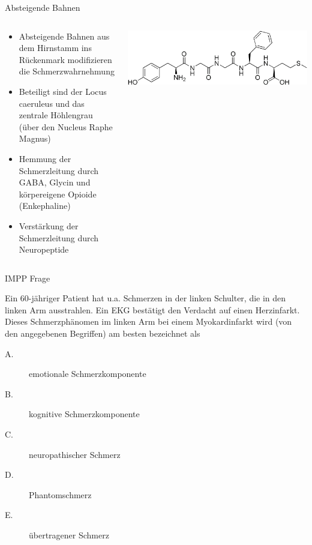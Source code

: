 \documentclass{beamer}
\begin{document}
\begin{frame}{Absteigende Bahnen}


\begin{columns}[c]

\begin{column}{7cm}
\begin{itemize}
    \item 
    Absteigende Bahnen aus dem Hirnstamm ins Rückenmark modifizieren die Schmerzwahrnehmung
    \item
    Beteiligt sind der Locus caeruleus und das zentrale Höhlengrau (über den Nucleus Raphe Magnus)
    \item
    Hemmung der Schmerzleitung durch GABA, Glycin und körpereigene Opioide (\textcolor{theme}{Enkephaline})
    \item
    Verstärkung der Schmerzleitung durch Neuropeptide
\end{itemize}

\end{column}

\begin{column}{3cm}
\begin{center}
    \includegraphics[width=2\textwidth, angle=90]{Met-enkephalin.png}
\end{center}
\end{column}


\end{columns}



\end{frame}










\begin{frame}{IMPP Frage}


Ein 60-jähriger Patient hat u.a. Schmerzen in der linken Schulter, die in den linken Arm ausstrahlen. Ein EKG bestätigt den Verdacht auf einen Herzinfarkt. Dieses Schmerzphänomen im linken Arm bei einem Myokardinfarkt wird (von den angegebenen Begriffen) am besten bezeichnet als 

\begin{description}
    \item[A.] emotionale Schmerzkomponente
    \item[B.] kognitive Schmerzkomponente
    \item[C.] neuropathischer Schmerz
    \item[D.] Phantomschmerz
    \item[E.] übertragener Schmerz
\end{description}
    
\end{frame}
\end{document}
